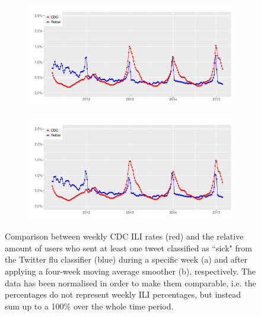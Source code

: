 \documentclass[11pt, a4paper,twoside]{report}\usepackage[]{graphicx}\usepackage[]{color}
\begin{document}
\begin{figure}[htbp!]
\centering
  \begin{subfigure}[t]{1\textwidth}
  \includegraphics[width=1\linewidth]{31_cdc_twitter_comp_nat_ma2_user.pdf}
  \caption{}
  \end{subfigure}
  
  \begin{subfigure}[t]{1\textwidth}
  \includegraphics[width=1\linewidth]{32_cdc_twitter_comp_nat_ma4_user.pdf}
  \caption{}
  \end{subfigure}
  \caption{Comparison between weekly CDC ILI rates (red) and the relative amount of users who sent at least one tweet classified as ``sick" from the Twitter flu classifier (blue) during a specific week (a) and after applying a four-week moving average smoother (b), respectively. The data has been normalised in order to make them comparable, i.e. the percentages do not represent weekly ILI percentages, but instead sum up to a 100\% over the whole time period.}
  \label{fig:cdc_tw_comp_nat_user}
\end{figure}
\end{document}
